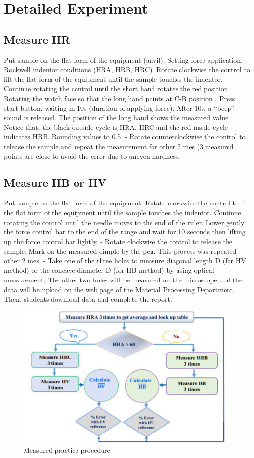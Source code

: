 \section{Detailed Experiment}
\subsection{Measure HR}
Put sample on the flat form of the equipment (anvil). Setting force application, Rockwell indentor conditions (HRA, HRB, HRC). Rotate clockwise the control to lift the flat form of the equipment until the sample touches the indentor. Continue rotating the control until the short hand rotates the red position. Rotating the watch face so that the long hand points at C-B position . Press start button, waiting in 10s (duration of applying force). After 10s, a “beep” sound is released. The position of the long hand shows the measured value. Notice that, the black outside cycle is HRA, HRC and the red inside cycle indicates HRB. Rounding values to 0.5. - Rotate counterclockwise the control to release the sample and repeat the measurement for other 2 mes (3 measured points are close to avoid the error due to uneven hardness.
\subsection{Measure HB or HV}
Put sample on the flat form of the equipment. Rotate clockwise the control to li the flat form of the equipment until the sample touches the indentor. Continue rotating the control until the needle moves to the end of the ruler. Lower gently the force control bar to the end of the range and wait for 10 seconds then lifting up the force control bar lightly. - Rotate clockwise the control to release the sample. Mark on the measured dimple by the pen. This process was repeated other 2 mes. - Take one of the three holes to measure diagonal length D (for HV method) or the concave diameter D (for HB method) by using optical measurement. The other two holes will be measured on the microscope and the data will be upload on the web page of the Material Processing Department. Then, students download data and complete the report.
\begin{figure}
	\centering
	\includegraphics[width=150mm]{2020-07-19 14.04.25 oemmndcbldboiebfnladdacbdfmadadm 4d3397925039.png}
	\caption{Measured practice procedure}
\end{figure}\clearpage

